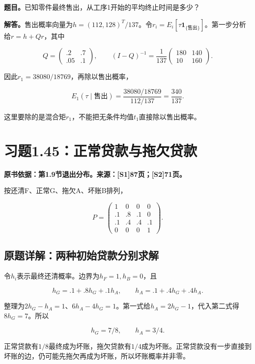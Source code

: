 \documentclass[
  11pt,
  a4paper,
  UTF8,
  fontset=fandol]{ctexart}
\begin{document}
\textbf{题目。}已知零件最终售出，从工序1开始的平均终止时间是多少？

\textbf{解答。}售出概率向量为\(h=(112,128)^T/137\)。令\(r_i=E_i[\tau\mathbf1_{\{\text{售出}\}}]\)。第一步分析给\(r=h+Qr\)，其中

\[
Q=\begin{pmatrix}.2&.7\\.05&.1\end{pmatrix},\qquad
(I-Q)^{-1}=\frac1{137}\begin{pmatrix}180&140\\10&160\end{pmatrix}.
\]

因此\(r_1=38080/18769\)，再除以售出概率，

\[
\boxed{E_1(\tau\mid\text{售出})=\frac{38080/18769}{112/137}=\frac{340}{137}.}
\]

这里要除的是混合矩\(r_1\)，不能把无条件均值\(t_1\)直接除以售出概率。

\section{习题1.45：正常贷款与拖欠贷款}\label{ux4e60ux98981.45ux6b63ux5e38ux8d37ux6b3eux4e0eux62d6ux6b20ux8d37ux6b3e}

\textbf{原书依据：第1.9节退出分布。来源：{[}S1{]}87页；{[}S2{]}71页。}

按还清F、正常G、拖欠A、坏账B排列，

\[
P=\begin{pmatrix}
1&0&0&0\\.1&.8&.1&0\\.1&.4&.4&.1\\0&0&0&1
\end{pmatrix}.
\]

\subsection{原题详解：两种初始贷款分别求解}\label{ux539fux9898ux8be6ux89e3ux4e24ux79cdux521dux59cbux8d37ux6b3eux5206ux522bux6c42ux89e3}

令\(h_i\)表示最终还清概率。边界为\(h_F=1,h_B=0\)，且

\[
h_G=.1+.8h_G+.1h_A,\qquad
h_A=.1+.4h_G+.4h_A.
\]

整理为\(2h_G-h_A=1\)、\(6h_A-4h_G=1\)。第一式给\(h_A=2h_G-1\)，代入第二式得\(8h_G=7\)。所以

\[
\boxed{h_G=7/8,\qquad h_A=3/4.}
\]

正常贷款有\(1/8\)最终成为坏账，拖欠贷款有\(1/4\)成为坏账。正常贷款没有一步直接到坏账的边，仍可能先拖欠再成为坏账，所以坏账概率并非零。
\end{document}
